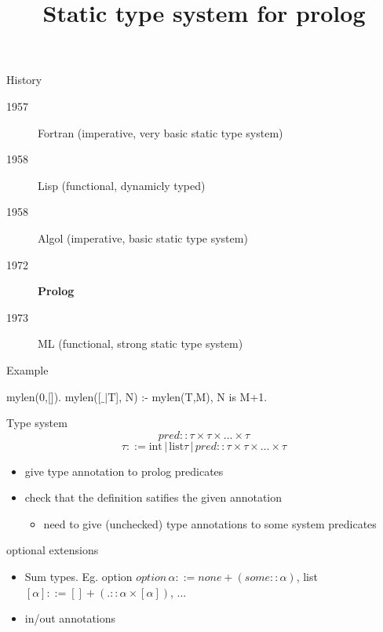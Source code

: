 \documentclass{beamer}
\title{Static type system for prolog}
\begin{document}
\begin{frame}
 \titlepage
\end{frame}

\begin{frame}{History}
 \begin{description}
   \item[1957] Fortran (imperative, very basic static type system)
   \item[1958] Lisp (functional, dynamicly typed)
   \item[1958] Algol (imperative, basic static type system)
   \item[1972] \textbf{Prolog}
   \item[1973] ML (functional, strong static type system)
\end{description}
\end{frame}
\begin{frame}{Example}

  mylen(0,[]).\newline
  mylen([$\_|$T], N) :- mylen(T,M), N is M+1.

\end{frame}
\begin{frame}{Type system}
$$
 pred :: \tau \times \tau\times\dots\times\tau 
 $$ 
 $$
 \tau ::= \text{int} \,|\, \text{list} \tau\,|\, pred :: \tau \times \tau\times\dots\times\tau
 $$
 \begin{itemize}
  \item give type annotation to prolog predicates
  \item check that the definition satifies the given annotation
  \begin{itemize}
   \item need to give (unchecked) type annotations to some system predicates
  \end{itemize}
 \end{itemize}

 
\end{frame}
\begin{frame}{optional extensions}
 \begin{itemize}
  \item Sum types. Eg. option $option\, \alpha ::= none + (some :: \alpha)$, list $[\alpha] ::= [] + (. :: \alpha \times [\alpha])$, ...
  \item in/out annotations
 \end{itemize}

\end{frame}
\end{document}
